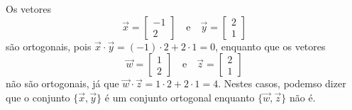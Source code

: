 \documentclass[../livro.tex]{subfiles}  %
\begin{document}
\begin{example}
	Os vetores
	\begin{equation}
	\vec{x} = \begin{bmatrix}
	-1 \\ 2
	\end{bmatrix} \quad \text{e} \quad
	\vec{y} = \begin{bmatrix}
	2 \\ 1
	\end{bmatrix}
	\end{equation} são ortogonais, pois $\vec{x} \cdot \vec{y} = (-1)\cdot 2 + 2 \cdot 1 = 0$, enquanto que os vetores
	\begin{equation}
	\vec{w} = \begin{bmatrix}
	1 \\ 2
	\end{bmatrix} \quad \text{e} \quad
	\vec{z} = \begin{bmatrix}
	2 \\ 1
	\end{bmatrix}
	\end{equation} não são ortogonais, já que $\vec{w} \cdot \vec{z} = 1\cdot 2 + 2 \cdot 1 = 4$. Nestes casos, podemso dizer que o conjunto $\{\vec{x}, \vec{y}\}$ é um conjunto ortogonal enquanto $\{\vec{w}, \vec{z}\}$ não é.
\end{example}
\end{document}
